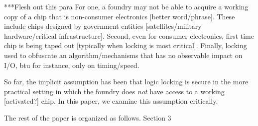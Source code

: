 ***Flesh out this para
For one, a foundry may not be able to 
acquire a working copy of a chip that is  
non-consumer electronics [better word/phrase]. 
These include chips designed by government entities [satellites/military 
hardware/critical infrastructure]. Second, even for consumer electronics, first time chip is being taped out [typically when locking is most critical]. 
Finally, locking used to obfuscate an algorithm/mechanisms that has no observable impact on I/O, btu for instance, only on timing/speed. 

So far, the implicit assumption has been that logic locking 
is secure in the more practical setting in which the 
foundry does \emph{not} have access to a working [activated?] chip. 
In this paper, we examine this assumption critically. 
  

 
   





 
 






The rest of the paper is organized as follows. Section 3 
